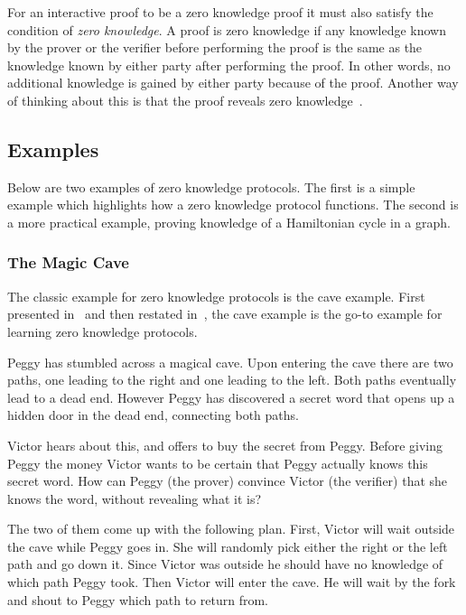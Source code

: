 \documentclass{sig-alternate}
\begin{document}
	For an interactive proof to be a zero knowledge proof it must also
	satisfy the condition of \textit{zero knowledge}.	
	A proof is zero knowledge if any knowledge known by
	the prover or the verifier before performing the proof is the same
	as the knowledge known by either party after performing the proof.			
	In other words, no additional knowledge is gained by either party because
	of the proof. Another way of thinking about this is that the proof reveals 	
	zero knowledge~\cite{Survey}.
	
	\newpage

	\subsection{Examples}
	
	Below are two examples of zero knowledge protocols. The
	first is a simple example which highlights how a zero knowledge
	protocol functions. The second is a more practical example,
	proving knowledge of a Hamiltonian cycle in a graph.
	
	\subsubsection{The Magic Cave}
	The classic example for zero knowledge protocols is the cave example.
	First presented in~\cite{Children:1987} and then restated
	in~\cite{Survey}, the cave example is the go-to example for learning
	zero knowledge protocols.

	Peggy has stumbled across a magical cave. Upon entering the cave
	there are two paths, one leading to the right and one leading to the
	left. Both paths eventually lead to a dead end. However Peggy has
	discovered a secret word that opens up a hidden door in the dead end,
	connecting both paths.

	Victor hears about this, and offers to buy the secret from Peggy.
	Before giving Peggy the money Victor
	wants to be certain that Peggy actually knows this secret word. How can
	Peggy (the prover) convince Victor (the verifier) that she knows the
	word, without revealing what it is?

	The two of them come up with the following plan. First, Victor will wait
	outside the cave while Peggy goes in. She will randomly pick either the
	right or the left path and go down it. Since Victor was outside he
	should have no knowledge of which path Peggy took. Then Victor will
	enter the cave. He will wait by the fork and shout to Peggy which
	path to return from. 
	
\end{document}
